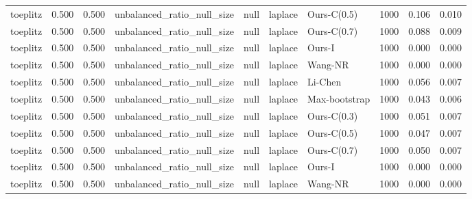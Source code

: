 \begin{tabular}{lrrllllrrr}
toeplitz & 0.500 & 0.500 & unbalanced\_ratio\_null\_size & null & laplace & Ours-C(0.5) & 1000 & 0.106 & 0.010 \\
toeplitz & 0.500 & 0.500 & unbalanced\_ratio\_null\_size & null & laplace & Ours-C(0.7) & 1000 & 0.088 & 0.009 \\
toeplitz & 0.500 & 0.500 & unbalanced\_ratio\_null\_size & null & laplace & Ours-I & 1000 & 0.000 & 0.000 \\
toeplitz & 0.500 & 0.500 & unbalanced\_ratio\_null\_size & null & laplace & Wang-NR & 1000 & 0.000 & 0.000 \\
toeplitz & 0.500 & 0.500 & unbalanced\_ratio\_null\_size & null & laplace & Li-Chen & 1000 & 0.056 & 0.007 \\
toeplitz & 0.500 & 0.500 & unbalanced\_ratio\_null\_size & null & laplace & Max-bootstrap & 1000 & 0.043 & 0.006 \\
toeplitz & 0.500 & 0.500 & unbalanced\_ratio\_null\_size & null & laplace & Ours-C(0.3) & 1000 & 0.051 & 0.007 \\
toeplitz & 0.500 & 0.500 & unbalanced\_ratio\_null\_size & null & laplace & Ours-C(0.5) & 1000 & 0.047 & 0.007 \\
toeplitz & 0.500 & 0.500 & unbalanced\_ratio\_null\_size & null & laplace & Ours-C(0.7) & 1000 & 0.050 & 0.007 \\
toeplitz & 0.500 & 0.500 & unbalanced\_ratio\_null\_size & null & laplace & Ours-I & 1000 & 0.000 & 0.000 \\
toeplitz & 0.500 & 0.500 & unbalanced\_ratio\_null\_size & null & laplace & Wang-NR & 1000 & 0.000 & 0.000 \\
\bottomrule
\end{tabular}

